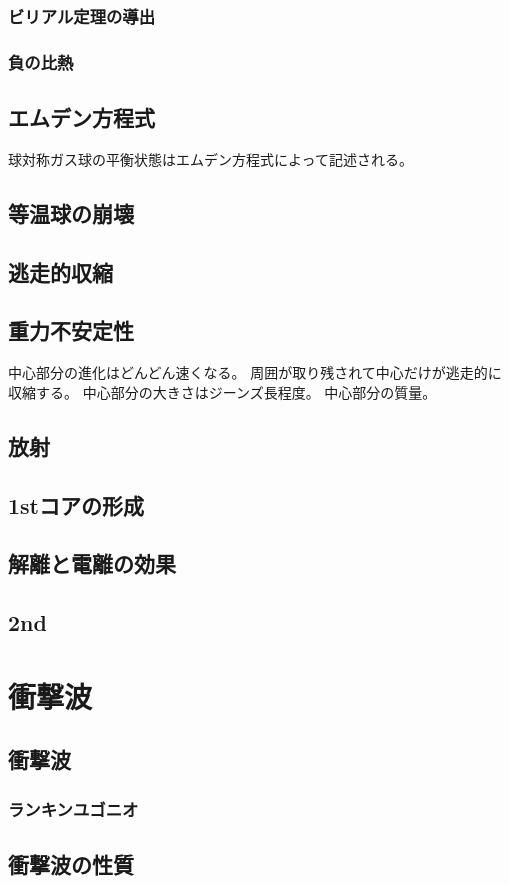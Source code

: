 \documentclass{jsarticle}
\begin{document}
\subsubsection{ビリアル定理の導出}
\subsubsection{負の比熱}
\subsection{エムデン方程式}
球対称ガス球の平衡状態はエムデン方程式によって記述される。
\subsection{等温球の崩壊}
\subsection{逃走的収縮}
\subsection{重力不安定性}
中心部分の進化はどんどん速くなる。
周囲が取り残されて中心だけが逃走的に収縮する。
中心部分の大きさはジーンズ長程度。
中心部分の質量。
\subsection{放射}
\subsection{1stコアの形成}
\subsection{解離と電離の効果}
\subsection{2nd}
\section{衝撃波}
\subsection{衝撃波}
\subsubsection{ランキンユゴニオ}
\subsection{衝撃波の性質}
\end{document}

